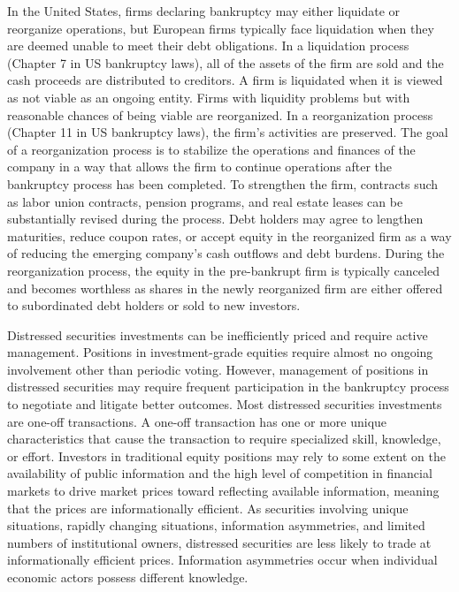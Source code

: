 \documentclass[11pt]{article}
\begin{document}
In the United States, firms declaring bankruptcy may either liquidate or reorganize operations, but European firms typically face liquidation when they are deemed unable to meet their debt obligations. In a liquidation process (Chapter 7 in US bankruptcy laws), all of the assets of the firm are sold and the cash proceeds are distributed to creditors. A firm is liquidated when it is viewed as not viable as an ongoing entity. Firms with liquidity problems but with reasonable chances of being viable are reorganized. In a reorganization process (Chapter 11 in US bankruptcy laws), the firm's activities are preserved. The goal of a reorganization process is to stabilize the operations and finances of the company in a way that allows the firm to continue operations after the bankruptcy process has been completed. To strengthen the firm, contracts such as labor union contracts, pension programs, and real estate leases can be substantially revised during the process. Debt holders may agree to lengthen maturities, reduce coupon rates, or accept equity in the reorganized firm as a way of reducing the emerging company's cash outflows and debt burdens. During the reorganization process, the equity in the pre-bankrupt firm is typically canceled and becomes worthless as shares in the newly reorganized firm are either offered to subordinated debt holders or sold to new investors.

Distressed securities investments can be inefficiently priced and require active management. Positions in investment-grade equities require almost no ongoing involvement other than periodic voting. However, management of positions in distressed securities may require frequent participation in the bankruptcy process to negotiate and litigate better outcomes. Most distressed securities investments are one-off transactions. A one-off transaction has one or more unique characteristics that cause the transaction to require specialized skill, knowledge, or effort. Investors in traditional equity positions may rely to some extent on the availability of public information and the high level of competition in financial markets to drive market prices toward reflecting available information, meaning that the prices are informationally efficient. As securities involving unique situations, rapidly changing situations, information asymmetries, and limited numbers of institutional owners, distressed securities are less likely to trade at informationally efficient prices. Information asymmetries occur when individual economic actors possess different knowledge.
\end{document}
